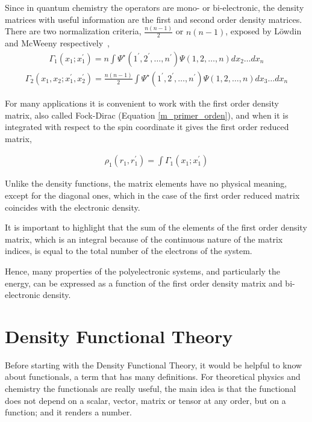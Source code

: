 Since in quantum chemistry the operators are mono- or bi-electronic, the density
matrices with useful information are the first and second order density
matrices. There are two
normalization criteria,
$\frac{n(n-1)}{2}$ or $n(n-1)$, exposed by L\"owdin and
McWeeny  respectively~\cite{Lwdin1955,mcweeny},
%
\begin{align}
\Gamma_{1} (x_1;x_1^{\prime}) = n\int\Psi^{\star}(1^{\prime}, 2^{\prime}, \ldots ,n^{\prime})\Psi(1, 2, \ldots , n) dx_{2} \ldots dx_{n}
\label{m_primer_orden}
\end{align}
\begin{align}
\Gamma_{2} (x_{1}, x_{2};x^{\prime}_{1},x^{\prime}_{2}) = \frac{n(n-1)}{2} \int\Psi^{\star}(1^{\prime}, 2^{\prime}, \ldots ,n^{\prime})
\Psi(1, 2, \ldots , n) dx_{3} \ldots dx_{n}
\end{align}

For many applications it is convenient to work with the first order density
matrix, also called Fock-Dirac (Equation \ref{m_primer_orden}), and when it is
integrated with respect to the spin coordinate it gives the first order reduced
matrix,

%
\begin{align}
\rho_{1}(r_{1},r^{\prime}_{1}) = \int\Gamma_{1} (x_{1};x_{1}^{\prime})
\label{m_r_1}
\end{align}

\noindent Unlike the density functions,
the matrix elements have no
physical meaning, except for the diagonal ones, which in the case of
the first order reduced matrix coincides with the electronic density.

It is important to highlight that the sum of the elements of the first order
density matrix, which is an integral because of the continuous nature of the matrix
indices, is equal to the total number of the electrons of the system.

Hence, many properties of the polyelectronic systems, and particularly the
energy, can be expressed as a function of the first order density matrix and
bi-electronic density.

\section{Density Functional Theory}

%
Before starting with the Density Functional Theory,%
it would be helpful to know
about functionals, a term that has many definitions. For theoretical physics
and chemistry the functionals are really useful, the main idea is that the
functional does not depend on a scalar, vector, matrix or tensor at any order,
but on a function; and it renders a number.

